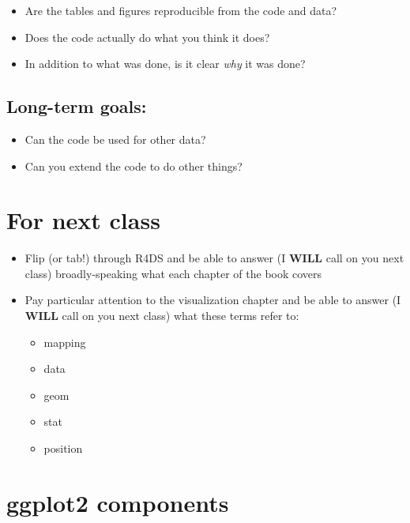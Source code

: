 \documentclass[
]{book}
\providecommand{\tightlist}{%
  \setlength{\itemsep}{0pt}\setlength{\parskip}{0pt}}
\theoremstyle{definition}
\theoremstyle{definition}
\theoremstyle{definition}
\theoremstyle{definition}
\theoremstyle{remark}
\begin{document}
\begin{itemize}
\tightlist
\item
  Are the tables and figures reproducible from the code and data?
\item
  Does the code actually do what you think it does?
\item
  In addition to what was done, is it clear \emph{why} it was done?
\end{itemize}

\hypertarget{long-term-goals}{%
\subsection{Long-term goals:}\label{long-term-goals}}

\begin{itemize}
\tightlist
\item
  Can the code be used for other data?
\item
  Can you extend the code to do other things?
\end{itemize}

\hypertarget{for-next-class}{%
\section{For next class}\label{for-next-class}}

\begin{itemize}
\tightlist
\item
  Flip (or tab!) through R4DS and be able to answer (I \textbf{WILL} call on you next class) broadly-speaking what each chapter of the book covers
\item
  Pay particular attention to the visualization chapter and be able to answer (I \textbf{WILL} call on you next class) what these terms refer to:

  \begin{itemize}
  \tightlist
  \item
    mapping
  \item
    data
  \item
    geom
  \item
    stat
  \item
    position
  \end{itemize}
\end{itemize}

\hypertarget{ggplot2-components}{%
\section{ggplot2 components}\label{ggplot2-components}}
\end{document}
